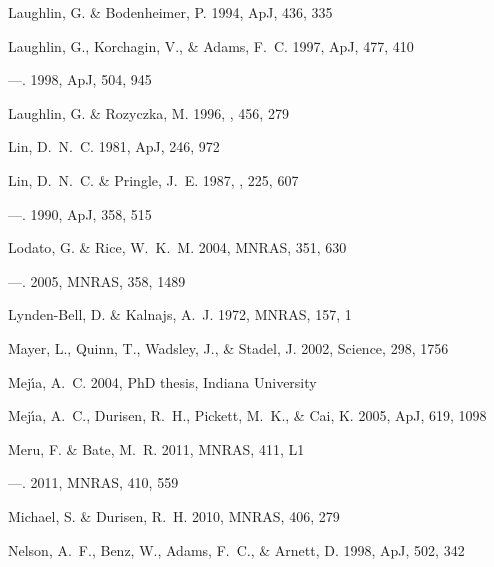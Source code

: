 \documentclass[manuscript]{aastex}
\begin{document}
\begin{thebibliography}{66}
{Laughlin}, G. \& {Bodenheimer}, P. 1994, ApJ, 436, 335

{Laughlin}, G., {Korchagin}, V., \& {Adams}, F.~C. 1997, ApJ, 477, 410

---. 1998, ApJ, 504, 945

{Laughlin}, G. \& {Rozyczka}, M. 1996, \apj, 456, 279

{Lin}, D.~N.~C. 1981, ApJ, 246, 972

{Lin}, D.~N.~C. \& {Pringle}, J.~E. 1987, \mnras, 225, 607

---. 1990, ApJ, 358, 515

{Lodato}, G. \& {Rice}, W.~K.~M. 2004, MNRAS, 351, 630

---. 2005, MNRAS, 358, 1489

{Lynden-Bell}, D. \& {Kalnajs}, A.~J. 1972, MNRAS, 157, 1

{Mayer}, L., {Quinn}, T., {Wadsley}, J., \& {Stadel}, J. 2002, Science, 298,
  1756

{Mej{\'{\i}}a}, A.~C. 2004, PhD thesis, Indiana University

{Mej{\'{\i}}a}, A.~C., {Durisen}, R.~H., {Pickett}, M.~K., \& {Cai}, K. 2005,
  ApJ, 619, 1098

{Meru}, F. \& {Bate}, M.~R. 2011{}, MNRAS, 411, L1

---. 2011{}, MNRAS, 410, 559

{Michael}, S. \& {Durisen}, R.~H. 2010, MNRAS, 406, 279

{Nelson}, A.~F., {Benz}, W., {Adams}, F.~C., \& {Arnett}, D. 1998, ApJ, 502,
  342


\end{thebibliography}
\end{document}
